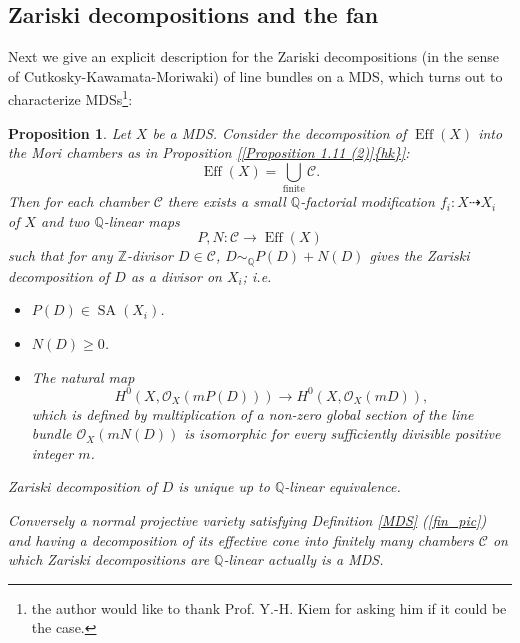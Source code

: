\documentclass[12pt,twoside]{amsart}
\newtheorem{prop}[theo]{Proposition}
\theoremstyle{definition}
\newcommand\SA{\mathop{\mathrm{SA}}\nolimits}
\newcommand\Eff{\mathop{\mathrm{Eff}}\nolimits}
\newcommand\bz{\mathbb{Z}}
\newcommand\bq{\mathbb{Q}}
\newcommand\OO{\mathcal{O}}
\begin{document}


\subsection{Zariski decompositions and the fan}\label{Zariski decompositions and the fan}

Next we give an explicit description for the Zariski decompositions (in the sense of Cutkosky-Kawamata-Moriwaki)
of line bundles on a MDS, which turns out to characterize MDSs\footnote{the author would like to thank Prof.
Y.-H. Kiem for asking him if it could be the case.}:


\begin{prop}\label{ZD}
Let $X$ be a MDS. Consider the decomposition of $\Eff{(X)}$ into
the Mori chambers as in Proposition \ref{[Proposition 1.11 (2)]{hk}}:
\begin{equation*}
\Eff{(X)}=\bigcup_{\textrm{finite}}\mathcal{C}.
\end{equation*}
Then for each chamber $\mathcal{C}$ there exists a small $\bq$-factorial modification
$f_i:X\dasharrow X_i$ of $X$ and two $\bq$-linear maps
\begin{equation*}
P,N:\mathcal{C}\to \Eff{(X)}
\end{equation*}
such that for any $\bz$-divisor $D\in \mathcal{C} $,
$D\sim_{\bq}P(D)+N(D)$ gives the Zariski decomposition of $D$ as a
divisor on $X_i$; i.e.
\begin{itemize}
\item
$P(D)\in\SA{(X_i)}$.
\item
$N(D)\ge 0$.
\item
The natural map
\begin{equation}\label{ZD map}
H^0(X,\OO_X(mP(D)))\to H^0(X,\mathcal{O}_X(mD)),
\end{equation}
which is defined by multiplication of a non-zero global section of
the line bundle $\mathcal{O}_X(mN(D))$
is isomorphic for every sufficiently divisible positive integer $m$.
\end{itemize}

Zariski decomposition of $D$ is unique up to $\bq$-linear equivalence.

Conversely a normal projective variety satisfying Definition \ref{MDS} (\ref{fin_pic})
and having a decomposition of its effective cone into finitely many chambers $\mathcal{C}$
on which Zariski decompositions are $\bq$-linear actually is a MDS.
\end{prop}
\end{document}
